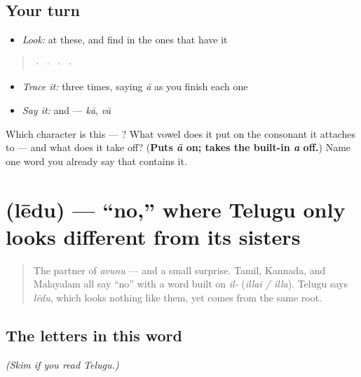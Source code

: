 \subsection*{Your turn}
\begin{itemize}
\raggedright
  \item \emph{Look:} at these, and find  in the ones that have it
\end{itemize}

\begin{quote}
  ·    ·    ·    ·  
\end{quote}

\begin{itemize}
\raggedright
  \item \emph{Trace it:}  three times, saying \emph{ā} as you finish each one
  \item \emph{Say it:}  and  — \emph{kā}, \emph{vā}
\end{itemize}

\begin{tcolorbox}[breakable,colback=teal!4,colframe=teal!35!black,title={Before you move on}]
Which character is this — ? What vowel does it put on the consonant it attaches to — and what does it take off? (\textbf{Puts \emph{ā} on; takes the built-in \emph{a} off.}) Name one word you already say that contains it.
\end{tcolorbox}
\section[\texorpdfstring{\te{లేదు} (lēdu)}{లేదు (lēdu)}]{ (lēdu) — \textquotedblleft{}no,\textquotedblright{} where Telugu only looks different from its sisters}

\label{lesson:TE-C01-ledu}



\begin{quote}
The partner of \emph{avunu} — and a small surprise. Tamil, Kannada, and Malayalam all say \textquotedblleft{}no\textquotedblright{} with a word built on \emph{il-} (\emph{illai / illa}). Telugu says \emph{lēdu}, which looks nothing like them, yet comes from the same root.
\end{quote}

\subsection*{The letters in this word}
\emph{(Skim if you read Telugu.)}

